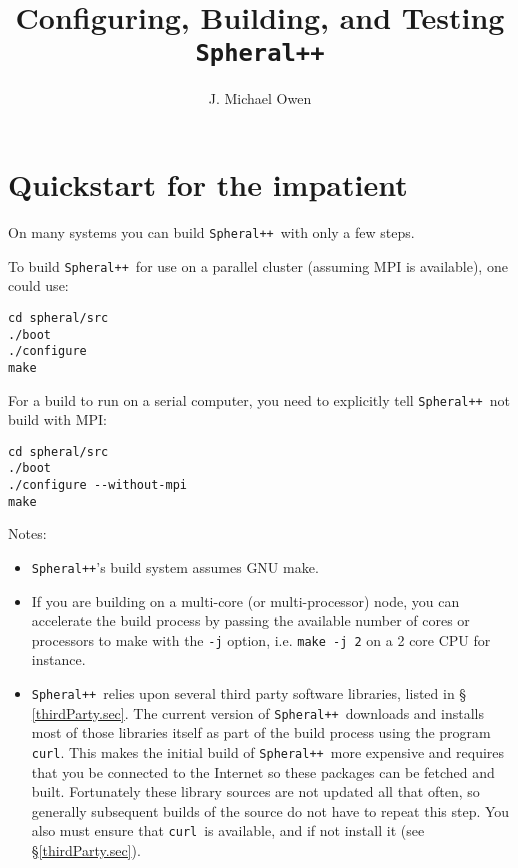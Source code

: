 \documentclass{article}
\newcommand{\Spheral}{{\tt Spheral++}}
\newcommand{\curl}{{\tt curl}}
\begin{document}
\title{Configuring, Building, and Testing \Spheral}
\author{J. Michael Owen}
\maketitle

\section{Quickstart for the impatient}
\label{quick.sec}
On many systems you can build \Spheral\ with only a few steps.

To build \Spheral\ for use on a parallel cluster (assuming MPI is available),
one could use:
\begin{verbatim}
cd spheral/src
./boot
./configure
make
\end{verbatim}

For a build to run on a serial computer, you need to explicitly tell
\Spheral\ not build with MPI:
\begin{verbatim}
cd spheral/src
./boot
./configure --without-mpi
make
\end{verbatim}
Notes:
\begin{itemize}
\item \Spheral's build system assumes GNU make.
\item If you are building on a multi-core (or multi-processor) node, you can
  accelerate the build process by passing the available number of cores or
  processors to make with the \verb+-j+ option, i.e. \verb+make -j 2+ on a 2
  core CPU for instance.
\item \Spheral\ relies upon several third party software libraries, listed in \S
  \ref{thirdParty.sec}.  The current version of \Spheral\ downloads and installs
  most of those libraries itself as part of the build process using the program
  \curl.  This makes the initial build of \Spheral\ more expensive and requires
  that you be connected to the Internet so these packages can be fetched and
  built.  Fortunately these library sources are not updated all that often, so
  generally subsequent builds of the source do not have to repeat this step.
  You also must ensure that \curl\ is available, and if not install it (see
  \S\ref{thirdParty.sec}).
\end{itemize}

\end{document}
